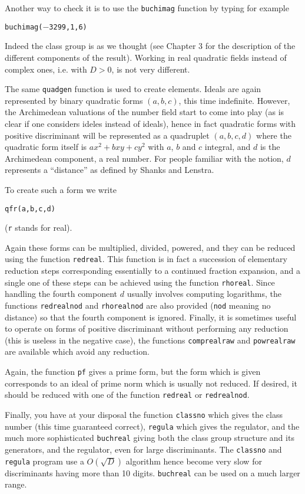 Another way to check it is to use the {\tt buchimag} function by typing
for example

\centerline{\tt buchimag($-$3299,1,6)}

Indeed the class group is as we thought (see Chapter 3 for the description of
the different components of the result).
\medskip
Working in real quadratic fields instead of complex ones, i.e. with $D>0$, is
not very different.

The same {\tt quadgen} function is used to create elements. Ideals are again
represented by binary quadratic forms $(a,b,c)$, this time indefinite. However,
the Archimedean valuations of the number field start to come into play (as
is clear if one considers ideles instead of ideals), hence in fact quadratic
forms with positive discriminant will be represented as a quadruplet
$(a,b,c,d)$ where the quadratic form itself is $ax^2+bxy+cy^2$ with $a$,
$b$ and $c$ integral, and $d$ is the Archimedean component, a real number.
For people familiar with the notion, $d$ represents a ``distance'' as defined
by Shanks and Lenstra.

To create such a form we write

\centerline{\tt qfr(a,b,c,d)}

({\tt r} stands for real).

Again these forms can be multiplied, divided, powered, and they can be reduced
using the function {\tt redreal}. This function is in fact a succession of
elementary reduction steps corresponding essentially to a continued fraction
expansion, and a single one of these steps can be achieved using the function
{\tt rhoreal}. Since handling the fourth component $d$ usually
involves computing logarithms, the functions {\tt redrealnod} and 
{\tt rhorealnod} are also provided ({\tt nod} meaning no distance) so that the
fourth component is ignored. Finally, it is sometimes useful to operate on
forms of positive discriminant without performing any reduction (this is
useless in the negative case), the functions {\tt comprealraw} and 
{\tt powrealraw} are available which avoid any reduction.

Again, the function {\tt pf} gives a prime form, but the form which is given
corresponds to an ideal of prime norm which is usually not reduced. If
desired, it should be reduced with one of the function {\tt redreal} or
{\tt redrealnod}.

Finally, you have at your disposal the function {\tt classno} which gives
the class number (this time guaranteed correct), {\tt regula} which gives
the regulator, and the much more sophisticated {\tt buchreal} giving both
the class group structure and its generators, and the regulator, even for
large discriminants.
The {\tt classno} and {\tt regula} program use a $O(\sqrt D)$ algorithm
hence become very slow for discriminants having more than 10 digits. 
{\tt buchreal} can be used on a much larger range.


